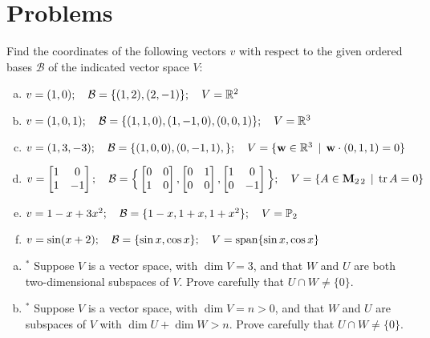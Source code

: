\section*{Problems}




\begin{prob}
\label{prob10.1} Find the coordinates of the following vectors $v$ with respect to the given ordered bases $\mathcal B$ of the indicated vector space $V$:
\begin{enumerate}[a)] \setlength{\itemsep}{2pt}
\item $v=(1,0); \quad \mathcal B=\{(1,2), (2,-1) \};\quad V=\mathbb{R}^2$
%
\item\sov $v=(1,0, 1); \quad\mathcal B=\{(1,1, 0), (1, -1, 0),(0,0,1)  \};\quad V=\mathbb{R}^3$
%
\item $v=(1,3, -3);\quad \mathcal B=\{(1,0, 0), (0, -1, 1),  \};\quad V=\{ \mathbf{w}\in\mathbb{R}^3 \,\mid \, \mathbf{w}\cdot (0,1,1)=0 \}$
%
\item\sov $v=\bmatrix 1&0\\1&-1\endbmatrix;\quad \mathcal B=\Big\{\bmatrix 0&0\\1&0\endbmatrix, \bmatrix 0&1\\0&0\endbmatrix , \bmatrix 1&0\\0&-1\endbmatrix \Big\};\quad V=\set{A \in  \M_{2 \,2}  \st \tr A=0}$
%
\item $v =1-x+3x^2;\quad \mathcal B=\{1-x, 1+x, 1+x^2  \};\quad V=\mathbb{P}_2$
%

\item\sov $v =\sin (x+2);\quad \mathcal B=\{\sin x, \cos x  \};\quad V=\textrm{span}\{\sin x, \cos x \}$
%
\end{enumerate}


 \end{prob}
\begin{prob}
\label{prob10.2}
\begin{enumerate}[a)]
\item$^\ast$ Suppose $V$ is a vector space, with $\dim V=3$, and that $W$ and $U$ are both two-dimensional subspaces of $V$. Prove carefully that $U \cap W \neq \{0\}$.\medskip
\item$^\ast$ Suppose $V$ is a vector space, with $\dim V=n>0$, and that $W$ and $U$ are subspaces of $V$ with $\dim U + \dim W > n$. Prove carefully that $U \cap W \neq \{0\}$.\medskip
\end{enumerate}

\end{prob} 

